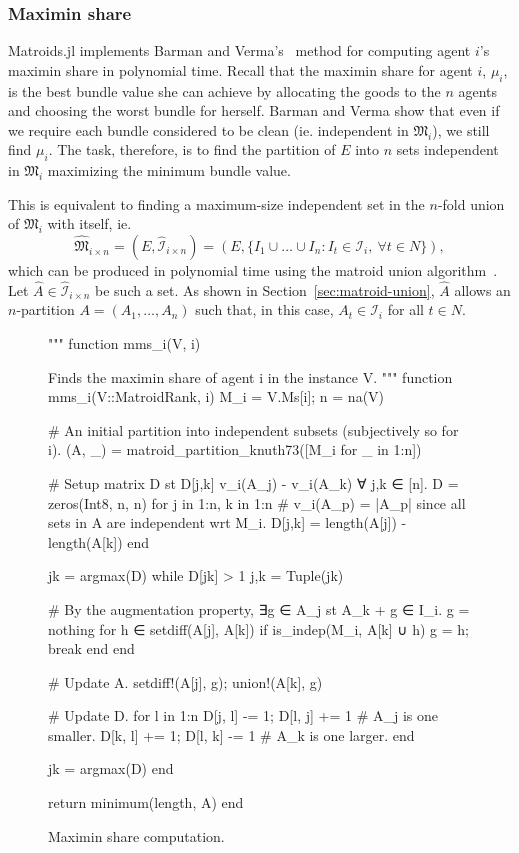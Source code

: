 \subsubsection*{Maximin share}
Matroids.jl implements Barman and Verma's~\cite[Appendix A]{barman2021existence} method for computing agent $i$'s maximin share in polynomial time. Recall that the maximin share for agent $i$,  $\mu_i$, is the best bundle value she can achieve by allocating the goods to the $n$ agents and choosing the worst bundle for herself. Barman and Verma show that even if we require each bundle considered to be clean (ie. independent in $\mathfrak{M}_i$), we still find $\mu_i$. The task, therefore, is to find the partition of $E$ into $n$ sets independent in $\mathfrak{M}_i$ maximizing the minimum bundle value.

This is equivalent to finding a maximum-size independent set in the $n$-fold union of $\mathfrak{M}_i$ with itself, ie.
$$\widehat{\mathfrak{M}}_{i \times n} = (E, \widehat{\mathcal{I}}_{i\times n}) = (E, \{ I_1\cup\dots\cup I_n : I_t \in \mathcal{I}_i,\ \forall t \in N \}),$$ 
which can be produced in polynomial time using the matroid union algorithm~\cite[Ch. 42]{schrijver-2003}. Let $\widehat{A}\in\widehat{\mathcal{I}}_{i\times n}$ be such a set. As shown in Section~\ref{sec:matroid-union}, $\widehat{A}$ allows an $n$-partition $A = (A_1,\dots,A_n)$ such that, in this case, $A_t\in\mathcal{I}_i$ for all $t\in N$.

\begin{figure}
    \begin{jllisting}
"""
    function mms_i(V, i)

Finds the maximin share of agent i in the instance V.
"""
function mms_i(V::MatroidRank, i)
    M_i = V.Ms[i]; n = na(V)

    # An initial partition into independent subsets (subjectively so for i).
    (A, _) = matroid_partition_knuth73([M_i for _ in 1:n])

    # Setup matrix D st D[j,k] v_i(A_j) - v_i(A_k) ∀ j,k ∈ [n].
    D = zeros(Int8, n, n)
    for j in 1:n, k in 1:n
        # v_i(A_p) = |A_p| since all sets in A are independent wrt M_i.
        D[j,k] = length(A[j]) - length(A[k])
    end

    jk = argmax(D)
    while D[jk] > 1
        j,k = Tuple(jk)

        # By the augmentation property, ∃g ∈ A_j st A_k + g ∈ I_i.
        g = nothing
        for h ∈ setdiff(A[j], A[k]) 
            if is_indep(M_i, A[k] ∪ h)
                g = h; break
            end 
        end

        # Update A.
        setdiff!(A[j], g); union!(A[k], g)

        # Update D.
        for l in 1:n
            D[j, l] -= 1; D[l, j] += 1 # A_j is one smaller.
            D[k, l] += 1; D[l, k] -= 1 # A_k is one larger.
        end

        jk = argmax(D)
    end
    
    return minimum(length, A)
end
    \end{jllisting}
    \caption{Maximin share computation.}
    \label{code:mms_i}
\end{figure}

